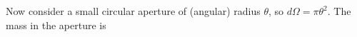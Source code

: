 Now consider a small circular aperture of (angular) radius $\theta$, so $d\Omega = \pi\theta^2$.  The mass in the aperture is
